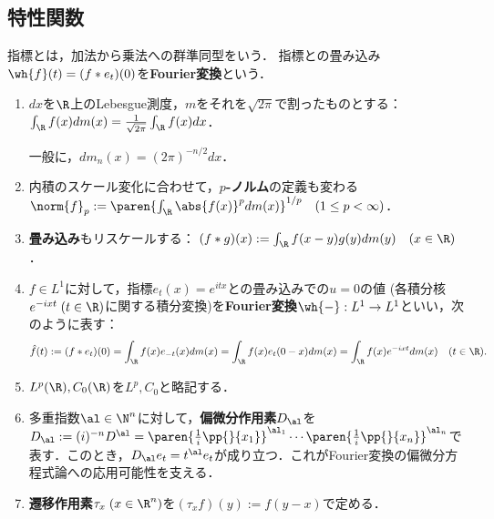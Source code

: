 \documentclass[uplatex,dvipdfmx]{jsreport}
\begin{document}
\subsection{特性関数}

\begin{tcolorbox}[colframe=ForestGreen, colback=ForestGreen!10!white,breakable,colbacktitle=ForestGreen!40!white,coltitle=black,fonttitle=\bfseries\sffamily,
title=]
    指標とは，加法から乗法への群準同型をいう．
    指標との畳み込み$\wh{f}(t)=(f*e_t)(0)$を\textbf{Fourier変換}という．
\end{tcolorbox}

\begin{notation}\mbox{}
    \begin{enumerate}
        \item $dx$を$\R$上のLebesgue測度，$m$をそれを$\sqrt{2\pi}$で割ったものとする：
        $\int_\R f(x)dm(x)=\frac{1}{\sqrt{2\pi}}\int_\R f(x)dx$．
        
        一般に，$dm_n(x)=(2\pi)^{-n/2}dx$．
        \item 内積のスケール変化に合わせて，\textbf{$p$-ノルム}の定義も変わる
        $\norm{f}_p:=\paren{\int_\R\abs{f(x)}^pdm(x)}^{1/p}\quad(1\le p<\infty)$．
        \item \textbf{畳み込み}もリスケールする：
        $(f*g)(x):=\int_\R f(x-y)g(y)dm(y)\quad(x\in\R)$．
        \item $f\in L^1$に対して，指標$e_t(x)=e^{itx}$との畳み込みでの$u=0$の値
        (各積分核$e^{-ixt}\;(t\in\R)$に関する積分変換)を\textbf{Fourier変換}$\wh{-}:L^1\to L^1$といい，次のように表す：
        \[\hat{f}(t):=(f*e_t)(0)=\int_\R f(x)e_{-t}(x)dm(x)=\int_\R f(x)e_t(0-x)dm(x)=\int_\R f(x)e^{-ixt}dm(x)\quad(t\in\R).\]
        \item $L^p(\R),C_0(\R)$を$L^p,C_0$と略記する．
        \item 多重指数$\al\in\N^n$に対して，\textbf{偏微分作用素}$D_\al$を$D_\al:=(i)^{-n}D^\al=\paren{\frac{1}{i}\pp{}{x_1}}^{\al_1}\cdots\paren{\frac{1}{i}\pp{}{x_n}}^{\al_n}$で表す．このとき，$D_\al e_t=t^\al e_t$が成り立つ．これがFourier変換の偏微分方程式論への応用可能性を支える．
        \item \textbf{遷移作用素}$\tau_x\;(x\in\R^n)$を$(\tau_xf)(y):=f(y-x)$で定める．
    \end{enumerate}
\end{notation}
\end{document}
